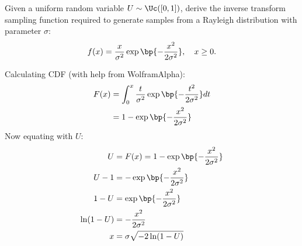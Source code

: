\documentclass{article}
\begin{document}
\MakeAssignmentTitle

\begin{homeworkProblem}

  Given a uniform random variable $U \sim \Uc([0,1])$, derive the inverse transform sampling function required
  to generate samples from a Rayleigh distribution with parameter $\sigma$:
  \[
    f(x) = \frac{x}{\sigma^2} \exp \bp{- \frac{x^2}{2\sigma^2}}, \quad x \geq 0.
  \]

  \solution

  Calculating CDF (with help from WolframAlpha):
  \begin{align*}
    F(x) & = \int_{0}^{x} \frac{t}{\sigma^2} \exp \bp{- \frac{t^2}{2\sigma^2}} dt \\
         & = 1 - \exp \bp{- \frac{x^2}{2\sigma^2}}
  \end{align*}
  Now equating with $U$:
  \begin{align*}
    U          & = F(x)  = 1 - \exp \bp{- \frac{x^2}{2\sigma^2}} \\
    U - 1      & = - \exp \bp{- \frac{x^2}{2\sigma^2}}           \\
    1 - U      & = \exp \bp{- \frac{x^2}{2\sigma^2}}             \\
    \ln(1 - U) & = - \frac{x^2}{2\sigma^2}                       \\
    x          & = \sigma \sqrt{-2 \ln(1 - U)}
  \end{align*}


\end{homeworkProblem}

\pagebreak
\end{document}
